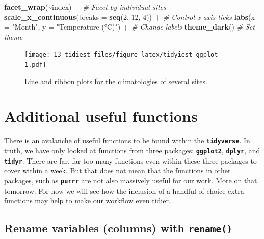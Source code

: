 \documentclass[
]{book}
\newenvironment{Shaded}{\begin{snugshade}}{\end{snugshade}}
\newcommand{\CommentTok}[1]{\textcolor[rgb]{0.56,0.35,0.01}{\textit{#1}}}
\newcommand{\DataTypeTok}[1]{\textcolor[rgb]{0.13,0.29,0.53}{#1}}
\newcommand{\DecValTok}[1]{\textcolor[rgb]{0.00,0.00,0.81}{#1}}
\newcommand{\KeywordTok}[1]{\textcolor[rgb]{0.13,0.29,0.53}{\textbf{#1}}}
\newcommand{\NormalTok}[1]{#1}
\newcommand{\OperatorTok}[1]{\textcolor[rgb]{0.81,0.36,0.00}{\textbf{#1}}}
\newcommand{\StringTok}[1]{\textcolor[rgb]{0.31,0.60,0.02}{#1}}
\begin{document}
\begin{Shaded}
\begin{Highlighting}[]
\StringTok{  }\KeywordTok{facet\_wrap}\NormalTok{(}\OperatorTok{\textasciitilde{}}\NormalTok{index) }\OperatorTok{+}\StringTok{ }\CommentTok{\# Facet by individual sites}
\StringTok{  }\KeywordTok{scale\_x\_continuous}\NormalTok{(}\DataTypeTok{breaks =} \KeywordTok{seq}\NormalTok{(}\DecValTok{2}\NormalTok{, }\DecValTok{12}\NormalTok{, }\DecValTok{4}\NormalTok{)) }\OperatorTok{+}\StringTok{ }\CommentTok{\# Control x axis ticks}
\StringTok{  }\KeywordTok{labs}\NormalTok{(}\DataTypeTok{x =} \StringTok{"Month"}\NormalTok{, }\DataTypeTok{y =} \StringTok{"Temperature (°C)"}\NormalTok{) }\OperatorTok{+}\StringTok{ }\CommentTok{\# Change labels}
\StringTok{  }\KeywordTok{theme\_dark}\NormalTok{() }\CommentTok{\# Set theme}
\end{Highlighting}
\end{Shaded}

\begin{figure}
\centering
\texttt{[image: 13-tidiest\_files/figure-latex/tidyiest-ggplot-1.pdf]}
\caption{\label{fig:tidyiest-ggplot}Line and ribbon plots for the climatologies of several sites.}
\end{figure}

\hypertarget{additional-useful-functions}{%
\section{Additional useful functions}\label{additional-useful-functions}}

There is an avalanche of useful functions to be found within the \textbf{\texttt{tidyverse}}. In truth, we have only looked at functions from three packages: \textbf{\texttt{ggplot2}}, \textbf{\texttt{dplyr}}, and \textbf{\texttt{tidyr}}. There are far, far too many functions even within these three packages to cover within a week. But that does not mean that the functions in other packages, such as \textbf{\texttt{purrr}} are not also massively useful for our work. More on that tomorrow. For now we will see how the inclusion of a handful of choice extra functions may help to make our workflow even tidier.

\hypertarget{rename-variables-columns-with-rename}{%
\subsection{\texorpdfstring{Rename variables (columns) with \texttt{rename()}}{Rename variables (columns) with rename()}}\label{rename-variables-columns-with-rename}}
\end{document}
